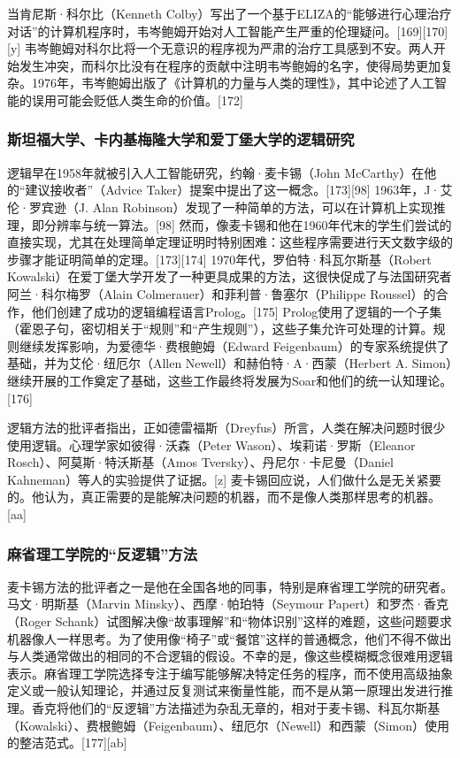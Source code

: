 当肯尼斯·科尔比（Kenneth Colby）写出了一个基于ELIZA的“能够进行心理治疗对话”的计算机程序时，韦岑鲍姆开始对人工智能产生严重的伦理疑问。[169][170][y] 韦岑鲍姆对科尔比将一个无意识的程序视为严肃的治疗工具感到不安。两人开始发生冲突，而科尔比没有在程序的贡献中注明韦岑鲍姆的名字，使得局势更加复杂。1976年，韦岑鲍姆出版了《计算机的力量与人类的理性》，其中论述了人工智能的误用可能会贬低人类生命的价值。[172]
\subsubsection{斯坦福大学、卡内基梅隆大学和爱丁堡大学的逻辑研究}
逻辑早在1958年就被引入人工智能研究，约翰·麦卡锡（John McCarthy）在他的“建议接收者”（Advice Taker）提案中提出了这一概念。[173][98] 1963年，J·艾伦·罗宾逊（J. Alan Robinson）发现了一种简单的方法，可以在计算机上实现推理，即分辨率与统一算法。[98] 然而，像麦卡锡和他在1960年代末的学生们尝试的直接实现，尤其在处理简单定理证明时特别困难：这些程序需要进行天文数字级的步骤才能证明简单的定理。[173][174] 1970年代，罗伯特·科瓦尔斯基（Robert Kowalski）在爱丁堡大学开发了一种更具成果的方法，这很快促成了与法国研究者阿兰·科尔梅罗（Alain Colmerauer）和菲利普·鲁塞尔（Philippe Roussel）的合作，他们创建了成功的逻辑编程语言Prolog。[175] Prolog使用了逻辑的一个子集（霍恩子句，密切相关于“规则”和“产生规则”），这些子集允许可处理的计算。规则继续发挥影响，为爱德华·费根鲍姆（Edward Feigenbaum）的专家系统提供了基础，并为艾伦·纽厄尔（Allen Newell）和赫伯特·A·西蒙（Herbert A. Simon）继续开展的工作奠定了基础，这些工作最终将发展为Soar和他们的统一认知理论。[176]

逻辑方法的批评者指出，正如德雷福斯（Dreyfus）所言，人类在解决问题时很少使用逻辑。心理学家如彼得·沃森（Peter Wason）、埃莉诺·罗斯（Eleanor Rosch）、阿莫斯·特沃斯基（Amos Tversky）、丹尼尔·卡尼曼（Daniel Kahneman）等人的实验提供了证据。[z] 麦卡锡回应说，人们做什么是无关紧要的。他认为，真正需要的是能解决问题的机器，而不是像人类那样思考的机器。[aa]
\subsubsection{麻省理工学院的“反逻辑”方法}
麦卡锡方法的批评者之一是他在全国各地的同事，特别是麻省理工学院的研究者。马文·明斯基（Marvin Minsky）、西摩·帕珀特（Seymour Papert）和罗杰·香克（Roger Schank）试图解决像“故事理解”和“物体识别”这样的难题，这些问题要求机器像人一样思考。为了使用像“椅子”或“餐馆”这样的普通概念，他们不得不做出与人类通常做出的相同的不合逻辑的假设。不幸的是，像这些模糊概念很难用逻辑表示。麻省理工学院选择专注于编写能够解决特定任务的程序，而不使用高级抽象定义或一般认知理论，并通过反复测试来衡量性能，而不是从第一原理出发进行推理。香克将他们的“反逻辑”方法描述为杂乱无章的，相对于麦卡锡、科瓦尔斯基（Kowalski）、费根鲍姆（Feigenbaum）、纽厄尔（Newell）和西蒙（Simon）使用的整洁范式。[177][ab]

